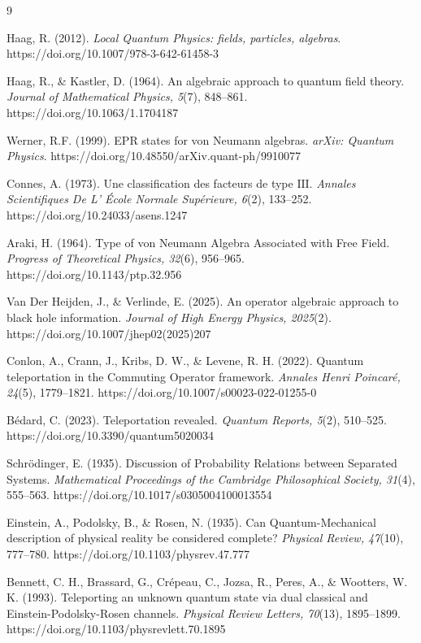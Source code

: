 \documentclass[a4paper,11pt]{article}
\begin{document}
\newpage
\begin{thebibliography}{9}

Haag, R. (2012). \emph{Local Quantum Physics: fields, particles, algebras}. https://doi.org/10.1007/978-3-642-61458-3

Haag, R., \& Kastler, D. (1964). An algebraic approach to quantum field theory. \emph{Journal of Mathematical Physics, 5}(7), 848–861. https://doi.org/10.1063/1.1704187

Werner, R.F. (1999). EPR states for von Neumann algebras. \emph{arXiv: Quantum Physics}. https://doi.org/10.48550/arXiv.quant-ph/9910077

Connes, A. (1973). Une classification des facteurs de type $\mathrm{III}$. \emph{Annales Scientifiques De L' École Normale Supérieure, 6}(2), 133–252. https://doi.org/10.24033/asens.1247

Araki, H. (1964). Type of von Neumann Algebra Associated with Free Field. \emph{Progress of Theoretical Physics, 32}(6), 956–965. https://doi.org/10.1143/ptp.32.956

Van Der Heijden, J., \& Verlinde, E. (2025). An operator algebraic approach to black hole information. \emph{Journal of High Energy Physics, 2025}(2). https://doi.org/10.1007/jhep02(2025)207

Conlon, A., Crann, J., Kribs, D. W., \& Levene, R. H. (2022). Quantum teleportation in the Commuting Operator framework. \emph{Annales Henri Poincaré, 24}(5), 1779–1821. https://doi.org/10.1007/s00023-022-01255-0

Bédard, C. (2023). Teleportation revealed. \emph{Quantum Reports, 5}(2), 510–525. https://doi.org/10.3390/quantum5020034

Schrödinger, E. (1935). Discussion of Probability Relations between Separated Systems. \emph{Mathematical Proceedings of the Cambridge Philosophical Society, 31}(4), 555–563. https://doi.org/10.1017/s0305004100013554

Einstein, A., Podolsky, B., \& Rosen, N. (1935). Can Quantum-Mechanical description of physical reality be considered complete? \emph{Physical Review, 47}(10), 777–780. https://doi.org/10.1103/physrev.47.777

Bennett, C. H., Brassard, G., Crépeau, C., Jozsa, R., Peres, A., \& Wootters, W. K. (1993). Teleporting an unknown quantum state via dual classical and Einstein-Podolsky-Rosen channels. \emph{Physical Review Letters, 70}(13), 1895–1899. https://doi.org/10.1103/physrevlett.70.1895


\end{thebibliography}
\end{document}
